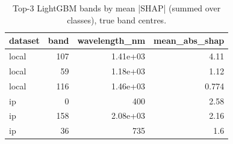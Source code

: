 \begin{table}
\caption{Top-3 LightGBM bands by mean |SHAP| (summed over classes), true band centres.}
\label{tab:shap_top_bands}
\begin{tabular}{lrrr}
\toprule
dataset & band & wavelength\_nm & mean\_abs\_shap \\
\midrule
local & 107 & 1.41e+03 & 4.11 \\
local & 59 & 1.18e+03 & 1.12 \\
local & 116 & 1.46e+03 & 0.774 \\
ip & 0 & 400 & 2.58 \\
ip & 158 & 2.08e+03 & 2.16 \\
ip & 36 & 735 & 1.6 \\
\bottomrule
\end{tabular}
\end{table}
